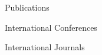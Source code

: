 \begin{rSection}{Publications}

\begin{pubSubsectionNum}{International Conferences}
  \item {}
  \item {}
\end{pubSubsectionNum}

\begin{pubSubsectionNum}{International Journals}
\end{pubSubsectionNum}




\end{rSection}
